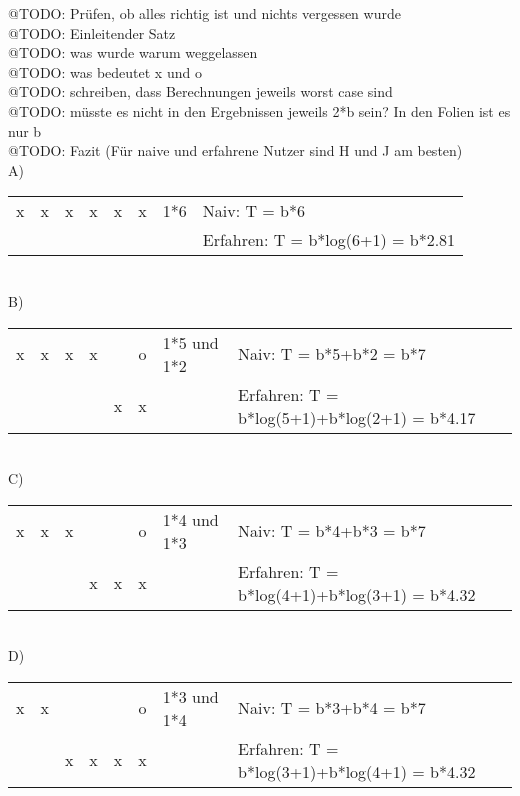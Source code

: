 \documentclass[a4paper,10pt]{article}
\begin{document}
\kopf
\renewcommand{\figurename}{Figure}


@TODO: Prüfen, ob alles richtig ist und nichts vergessen wurde \\
@TODO: Einleitender Satz \\
@TODO: was wurde warum weggelassen \\
@TODO: was bedeutet x und o \\
@TODO: schreiben, dass Berechnungen jeweils worst case sind \\
@TODO: müsste es nicht in den Ergebnissen jeweils 2*b sein? In den Folien ist es nur b \\
@TODO: Fazit (Für naive und erfahrene Nutzer sind H und J am besten)\\

A)\\
\begin{tabular}{|c|c|c|c|c|c|l|l}
\cline{1-6} x & x & x & x & x & x & 1*6 \: \: \: \: \: \: \: & Naiv: T = b*6 \\
\cline{1-6}   &   &   &   &   &   &   & Erfahren: T = b*log(6+1) = b*2.81\\
\cline{1-6}
\end{tabular} \\

B)\\
\begin{tabular}{|c|c|c|c|c|c|l|l}
\cline{1-6} x & x & x & x &   & o & 1*5 und 1*2 & Naiv: T = b*5+b*2 = b*7 \\
\cline{1-6}   &   &   &   & x & x &   & Erfahren: T = b*log(5+1)+b*log(2+1) = b*4.17 \\
\cline{1-6}
\end{tabular} \\

C)\\
\begin{tabular}{|c|c|c|c|c|c|l|l}
\cline{1-6} x & x & x &   &   & o & 1*4 und 1*3 & Naiv: T = b*4+b*3 = b*7 \\
\cline{1-6}   &   &   & x & x & x &   & Erfahren: T = b*log(4+1)+b*log(3+1) = b*4.32 \\
\cline{1-6}
\end{tabular} \\

D)\\
\begin{tabular}{|c|c|c|c|c|c|l|l}
\cline{1-6} x & x &   &   &   & o & 1*3 und 1*4 & Naiv: T = b*3+b*4 = b*7 \\
\cline{1-6}   &   & x & x & x & x &   & Erfahren: T = b*log(3+1)+b*log(4+1) = b*4.32 \\
\cline{1-6}
\end{tabular} \\
\end{document}
